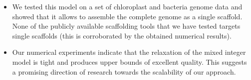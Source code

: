 \begin{itemize}
\item   We tested this model on a set of chloroplast and bacteria  genome data  and showed that it allows  to assemble the complete genome as a single scaffold. None of the publicly available scaffolding tools that we have tested targets  single scaffolds (this is corroborated by the obtained numerical results). 
\item Our numerical experiments indicate that the relaxation of the mixed integer model is tight and produces upper bounds of excellent quality. This suggests a promising direction of research towards the scalability of our approach.

\end{itemize}

